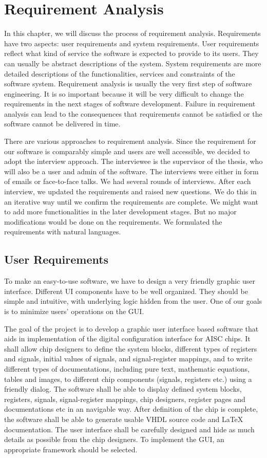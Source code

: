 \chapter{Requirement Analysis}
In this chapter, we will discuss the process of requirement analysis. Requirements have two aspects: user requirements and system requirements. User requirements reflect what kind of service the software is expected to provide to its users. They can usually be abstract descriptions of the system. System requirements are more detailed descriptions of the functionalities, services and constraints of the software system. Requirement analysis is usually the very first step of software engineering. It is so important because it will be very difficult to change the requirements in the next stages of software development. Failure in requirement analysis can lead to the consequences that requirements cannot be satisfied or the software cannot be delivered in time.

There are various approaches to requirement analysis. Since the requirement for our software is comparably simple and users are well accessible, we decided to adopt the interview approach. The interviewee is the supervisor of the thesis, who will also be a user and admin of the software. The interviews were either in form of emails or face-to-face talks. We had several rounds of interviews. After each interview, we updated the requirements and raised new questions. We do this in an iterative way until we confirm the requirements are complete. We might want to add more functionalities in the later development stages. But no major modifications would be done on the requirements. We formulated the requirements with natural languages.

\section{User Requirements}

To make an easy-to-use software, we have to design a very friendly graphic user interface. Different UI components have to be well organized. They should be simple and intuitive, with underlying logic hidden from the user. One of our goals is to minimize users' operations on the GUI.

The goal of the project is to develop a graphic user interface based software that aids in implementation of the digital configuration interface for AISC chips. It shall allow chip designers to define the system blocks, different types of registers and signals, initial values of signals, and signal-register mappings, and to write different types of documentations, including pure text, mathematic equations, tables and images, to different chip components (signals, registers etc.) using a friendly dialog. The software shall be able to display defined system blocks, registers, signals, signal-register mappings, chip designers, register pages and documentations etc in an navigable way. After definition of the chip is complete, the software shall be able to generate usable VHDL source code and LaTeX documentation. The user interface shall be carefully designed and hide as much details as possible from the chip designers. To implement the GUI, an appropriate framework should be selected.

